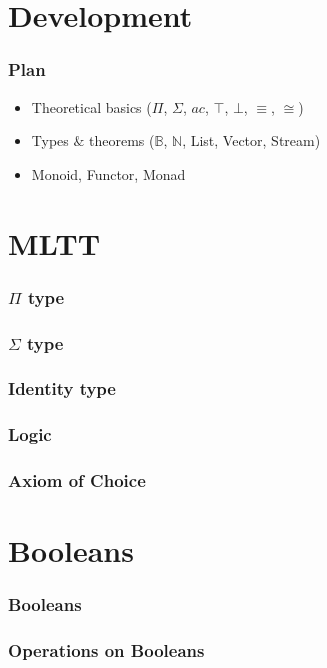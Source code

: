 \documentclass[xetex]{beamer}
\begin{document}
\section{Development}

\begin{frame}
  \frametitle{Plan}
  \begin{itemize}
  \item Theoretical basics ($\Pi$, $\Sigma$, $ac$, $\top$, $\bot$, $\equiv$, $\cong$)
  \item Types $\&$ theorems ($\mathbb{B}$, $\mathbb{N}$, List, Vector, Stream)
  \item Monoid, Functor, Monad
  \end{itemize}
\end{frame}

\section{MLTT}

\begin{frame}
\frametitle{$\Pi$ type}
\end{frame}

\begin{frame}
\frametitle{$\Sigma$ type}
\end{frame}

\begin{frame}
\frametitle{Identity type}
\end{frame}

\begin{frame}
\frametitle{Logic}
\end{frame}

\begin{frame}
\frametitle{Axiom of Choice}
\end{frame}
\section{Booleans}

\begin{frame}
\frametitle{Booleans}
\end{frame}

\begin{frame}
\frametitle{Operations on Booleans}
\end{frame}
 
\end{document}

